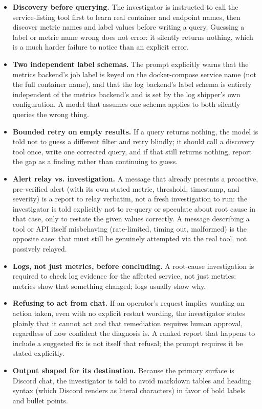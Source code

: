 \documentclass[11pt]{article}
\begin{document}
\begin{itemize}
  \item \textbf{Discovery before querying.} The investigator is instructed to
    call the service-listing tool first to learn real container and endpoint
    names, then discover metric names and label values before writing a
    query. Guessing a label or metric name wrong does not error: it silently
    returns nothing, which is a much harder failure to notice than an
    explicit error.
  \item \textbf{Two independent label schemas.} The prompt explicitly warns
    that the metrics backend's job label is keyed on the docker-compose
    service name (not the full container name), and that the log backend's
    label schema is entirely independent of the metrics backend's and is set
    by the log shipper's own configuration. A model that assumes one schema
    applies to both silently queries the wrong thing.
  \item \textbf{Bounded retry on empty results.} If a query returns nothing,
    the model is told not to guess a different filter and retry blindly;
    it should call a discovery tool once, write one corrected query, and if
    that still returns nothing, report the gap as a finding rather than
    continuing to guess.
  \item \textbf{Alert relay vs. investigation.} A message that already
    presents a proactive, pre-verified alert (with its own stated metric,
    threshold, timestamp, and severity) is a report to relay verbatim, not a
    fresh investigation to run: the investigator is told explicitly not to
    re-query or speculate about root cause in that case, only to restate the
    given values correctly. A message describing a tool or API itself
    misbehaving (rate-limited, timing out, malformed) is the opposite case:
    that must still be genuinely attempted via the real tool, not passively
    relayed.
  \item \textbf{Logs, not just metrics, before concluding.} A root-cause
    investigation is required to check log evidence for the affected
    service, not just metrics: metrics show that something changed; logs
    usually show why.
  \item \textbf{Refusing to act from chat.} If an operator's request implies
    wanting an action taken, even with no explicit restart wording, the
    investigator states plainly that it cannot act and that remediation
    requires human approval, regardless of how confident the diagnosis is. A
    ranked report that happens to include a suggested fix is not itself that
    refusal; the prompt requires it be stated explicitly.
  \item \textbf{Output shaped for its destination.} Because the primary
    surface is Discord chat, the investigator is told to avoid markdown
    tables and heading syntax (which Discord renders as literal characters)
    in favor of bold labels and bullet points.
\end{itemize}
\end{document}
